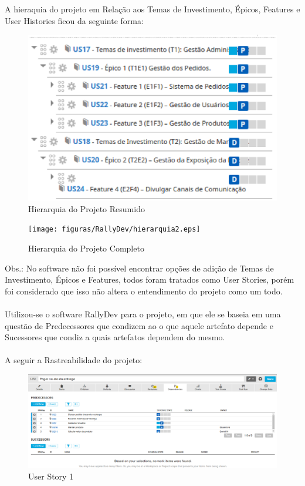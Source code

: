 \tab A hieraquia do projeto em Relação aos Temas de Investimento, Épicos, Features e User Histories ficou da seguinte forma:\\

\begin{figure}[h]
    \centering
    \label{fig01}
        \includegraphics[keepaspectratio=true,scale=0.5]{figuras/RallyDev/hierarquia1.eps}
    \caption{Hierarquia do Projeto Resumido}
\end{figure}

\begin{figure}[h]
    \centering
    \label{fig01}
        \texttt{[image: figuras/RallyDev/hierarquia2.eps]}
    \caption{Hierarquia do Projeto Completo}
\end{figure}

Obs.: No software não foi possível encontrar opções de adição de Temas de Investimento, Épicos e Features, todos foram tratados como User Stories, porém foi considerado que isso não altera o entendimento do projeto como um todo.\\
\\
\tab Utilizou-se o software RallyDev para o projeto, em que ele se baseia em uma questão de Predecessores que condizem ao o que aquele artefato depende e Sucessores que condiz a quais artefatos dependem do mesmo.\\ \\
\tab A seguir a Rastreabilidade do projeto:\\

\begin{figure}[h]
    \centering
    \label{fig01}
        \includegraphics[keepaspectratio=true,scale=0.3]{figuras/RallyDev/US1.eps}
    \caption{User Story 1}
\end{figure}

